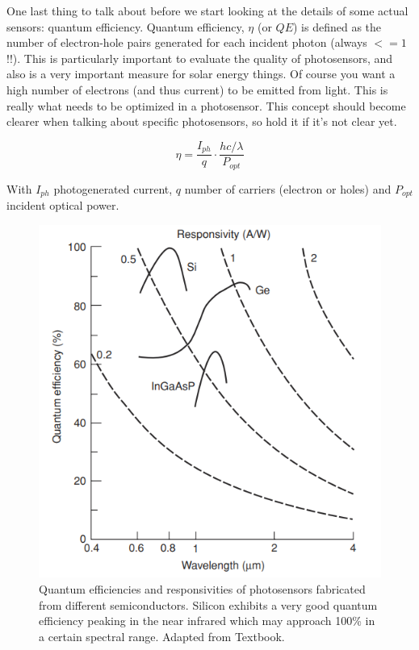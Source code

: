 One last thing to talk about before we start looking at the details of some actual sensors: quantum efficiency. Quantum efficiency, $\eta$ (or $QE$) is defined as the number of electron-hole pairs generated for each incident photon (always $<=1$ !!). This is particularly important to evaluate the quality of photosensors, and also is a very important measure for solar energy things. Of course you want a high number of electrons (and thus current) to be emitted from light. This is really what needs to be optimized in a photosensor. This concept should become clearer when talking about specific photosensors, so hold it if it's not clear yet. 

\begin{equation}
    \eta = \frac{I_{ph}}{q}\cdot \frac{hc/\lambda}{P_{opt}}
\end{equation}

With $I_{ph}$ photogenerated current, $q$ number of carriers (electron or holes) and $P_{opt}$ incident optical power.

\begin{figure}[H]
    \centering
    \includegraphics[width=0.6\linewidth]{../../Figures/Quantum_Efficiency.PNG}
    \caption{Quantum efficiencies and responsivities of photosensors fabricated from different semiconductors. Silicon exhibits a very good quantum efficiency peaking in the near infrared which may approach 100\% in a certain spectral range. Adapted from Textbook.}
    \label{fig:Quantum_Efficiency}
\end{figure}




